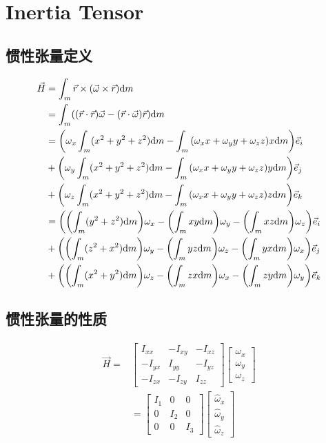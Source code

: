 \section{Inertia Tensor}
\subsection{惯性张量定义}
\begin{equation}
  \begin{split}
    \vec{H}&=\int_m\vec{r}\times(\vec{\omega}\times\vec{r})\mathrm{d}m\\
    &=\int_m((\vec{r}\cdot\vec{r})\vec{\omega}-(\vec{r}\cdot\vec{\omega})\vec{r})\mathrm{d}m\\
    &=\qty(\omega_x\int_m(x^2+y^2+z^2)\mathrm{d}m-\int_m\qty(\omega_xx+\omega_yy+\omega_zz)x\mathrm{d}m)\vec{e}_i\\
    &+\qty(\omega_y\int_m(x^2+y^2+z^2)\mathrm{d}m-\int_m\qty(\omega_xx+\omega_yy+\omega_zz)y\mathrm{d}m)\vec{e}_j\\
    &+\qty(\omega_z\int_m(x^2+y^2+z^2)\mathrm{d}m-\int_m\qty(\omega_xx+\omega_yy+\omega_zz)z\mathrm{d}m)\vec{e}_k\\
    &=\qty(\qty(\int_m(y^2+z^2)\mathrm{d}m)\omega_x-\qty(\int_mxy\mathrm{d}m)\omega_y-\qty(\int_mxz\mathrm{d}m)\omega_z)\vec{e}_i\\
    &+\qty(\qty(\int_m(z^2+x^2)\mathrm{d}m)\omega_y-\qty(\int_myz\mathrm{d}m)\omega_z-\qty(\int_myx\mathrm{d}m)\omega_x)\vec{e}_j\\
    &+\qty(\qty(\int_m(x^2+y^2)\mathrm{d}m)\omega_z-\qty(\int_mzx\mathrm{d}m)\omega_x-\qty(\int_mzy\mathrm{d}m)\omega_y)\vec{e}_k
  \end{split}
\end{equation}
\subsection{惯性张量的性质}
\begin{equation}
  \begin{split}
    \vec{H}=&
    \begin{bmatrix}
      I_{xx} & -I_{xy} & -I_{xz} \\
      -I_{yx} & I_{yy} & -I_{yz} \\
      -I_{zx} & -I_{zy} & I_{zz}
    \end{bmatrix}
    \begin{bmatrix}
      \omega_x \\
      \omega_y \\
      \omega_z
    \end{bmatrix}\\
    &=
    \begin{bmatrix}
      I_1 & 0 & 0 \\
      0 & I_2 & 0 \\
      0 & 0 & I_3
    \end{bmatrix}
    \begin{bmatrix}
      \hat{\omega}_x \\
      \hat{\omega}_y \\
      \hat{\omega}_z
    \end{bmatrix}
  \end{split}
\end{equation}
